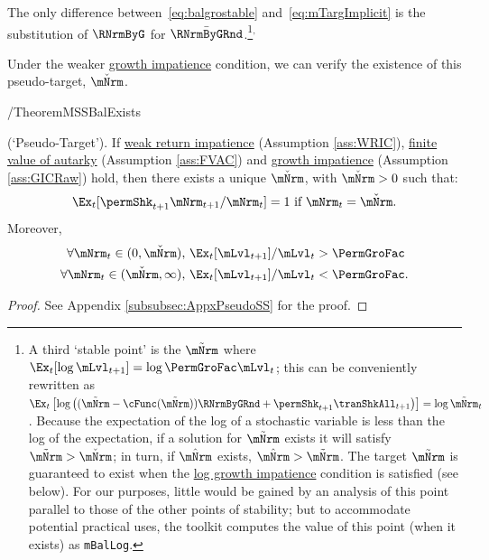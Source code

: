 \documentclass[BufferStockTheory]{subfiles}
\begin{document}
The only difference between~\eqref{eq:balgrostable} and~\eqref{eq:mTargImplicit} is the substitution of $\RNrmByG$ for $\bar{\RNrmByGRnd}$.\footnote{A third `stable point' is the $\mBalLog$ where $\Ex_{t}[\log \mLvl_{t+1}] = \log \PermGroFac \mLvl_{t}$; this can be conveniently rewritten as $\Ex_{t}\left[\log\left((\mBalLog-\usual{\cFunc}(\mBalLog))\RNrmByGRnd+\permShk_{t+1}\tranShkAll_{t+1}\right)\right]  = \log \mBalLog_{t}$.
Because the expectation of the log of a stochastic variable is less than the log of the expectation, if a solution for $\mBalLog$ exists it will satisfy $\mBalLog > \mBalLvl$; in turn, if $\mTrgNrm$ exists, $\mTrgNrm>\mBalLog$.
The target $\mBalLog$ is guaranteed to exist when the \hyperlink{GICSdl}{log growth impatience} condition is satisfied (see below).
For our purposes, little would be gained by an analysis of this point parallel to those of the other points of stability; but to accommodate potential practical uses,  the {\ARKurl} toolkit computes the value of this point (when it exists) as \texttt{mBalLog}.}$^{,}$










Under the weaker  \hyperlink{GIC}{growth impatience} condition, we can verify the existence of this pseudo-target, $\mBalLvl$.

\begin{verbatimwrite}{\EqDir/TheoremMSSBalExists}
  \begin{theorem}(`Pseudo-Target').
If \hyperlink{WRIC}{weak return impatience} (Assumption \ref{ass:WRIC}), \hyperlink{FVAC}{finite value of autarky} (Assumption \ref{ass:FVAC}) and \hyperlink{GIC}{growth impatience} (Assumption \ref{ass:GICRaw}) hold, then there exists a unique $\mBalLvl$, with $\mBalLvl>0$ such that:
    \begin{equation}
      \Ex_t [\permShk_{t+1}{\mNrm}_{t+1}/\mNrm_t] = 1 \mbox{~if~} \mNrm_t = \mBalLvl.
      \label{eq:mBalLvl}
    \end{equation}
    Moreover,
    \begin{equation}
      \label{eq:stabilityStE}
      \begin{aligned}
        \forall {\mNrm}_t\in(0,\mBalLvl),      \,\,& \Ex_{t}[\mLvl_{t+1}]/\mLvl_{t} > \PermGroFac \\
        \forall {\mNrm}_t\in(\mBalLvl,\infty), \,\,& \Ex_{t}[\mLvl_{t+1}]/\mLvl_{t} < \PermGroFac.
      \end{aligned}
    \end{equation}
  \end{theorem}
\end{verbatimwrite} \unskip

\begin{proof}
See Appendix \ref{subsubsec:AppxPseudoSS} for the proof.

\end{proof}
\end{document}
